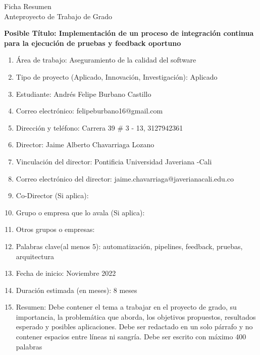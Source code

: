 \thispagestyle{empty}
\begin{center}
    \Large{Ficha Resumen \\ Anteproyecto de Trabajo de Grado}
\end{center}

\textbf{Posible Título: Implementación de un proceso de integración continua para la ejecución de pruebas y feedback oportuno}
\begin{enumerate}
    \item Área de trabajo: Aseguramiento de la calidad del software
    \item Tipo de proyecto (Aplicado, Innovación, Investigación): Aplicado
    \item Estudiante: Andrés Felipe Burbano Castillo
    \item Correo electrónico: felipeburbano16@gmail.com
    \item Dirección y teléfono: Carrera 39 # 3 - 13, 3127942361
    \item Director: Jaime Alberto Chavarriaga Lozano
    \item Vinculación del director: Pontificia Universidad Javeriana -Cali
    \item Correo electrónico del director: jaime.chavarriaga@javerianacali.edu.co
    \item Co-Director (Si aplica):
    \item Grupo o empresa que lo avala (Si aplica):
    \item Otros grupos o empresas:
    \item Palabras clave(al menos 5): automatización, pipelines, feedback, pruebas, arquitectura
    \item Fecha de inicio: Noviembre 2022
    \item Duración estimada (en meses): 8 meses
    \item Resumen:  Debe contener el tema a trabajar en el proyecto de grado, su importancia, la problemática que aborda, los objetivos propuestos, resultados esperado y posibles aplicaciones.  Debe ser redactado en un solo párrafo y no contener espacios entre líneas ni sangría.  Debe ser escrito con máximo 400 palabras 
\end{enumerate}

